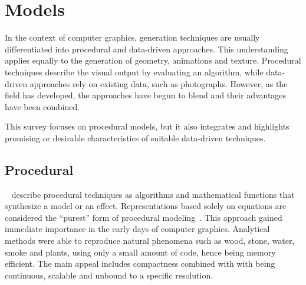 

\section{Models}
\label{sec:models}

In the context of computer graphics, generation techniques are usually differentiated into procedural and data-driven approaches. This understanding applies equally to the generation of geometry, animations and texture. Procedural techniques describe the visual output by evaluating an algorithm, while data-driven approaches rely on existing data, such as photographs. However, as the field has developed, the approaches have begun to blend and their advantages have been combined. 

This survey focuses on procedural models, but it also integrates and highlights promising or desirable characteristics of suitable data-driven techniques.

\subsection{Procedural}
\label{subsec:models_procedural}

\citeauthor*{ebert_2003_tmp}~\cite{ebert_2003_tmp} describe procedural techniques as algorithms and mathematical functions that synthesize a model or an effect. Representations based solely on equations are considered the ``purest'' form of procedural modeling~\cite{smelik_2014_aso}. This approach gained immediate importance in the early days of computer graphics. Analytical methods were able to reproduce natural phenomena such as wood, stone, water, smoke and plants, using only a small amount of code, hence being memory efficient. The main appeal includes compactness combined with with being continuous, scalable and unbound to a specific resolution.

